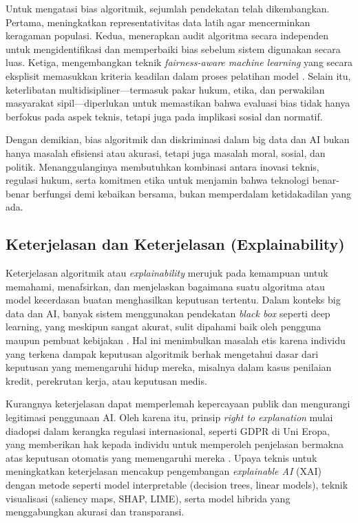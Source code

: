 Untuk mengatasi bias algoritmik, sejumlah pendekatan telah dikembangkan. Pertama, meningkatkan representativitas data latih agar mencerminkan keragaman populasi. Kedua, menerapkan audit algoritma secara independen untuk mengidentifikasi dan memperbaiki bias sebelum sistem digunakan secara luas. Ketiga, mengembangkan teknik \textit{fairness-aware machine learning} yang secara eksplisit memasukkan kriteria keadilan dalam proses pelatihan model \cite{mehrabi2021survey}. Selain itu, keterlibatan multidisipliner—termasuk pakar hukum, etika, dan perwakilan masyarakat sipil—diperlukan untuk memastikan bahwa evaluasi bias tidak hanya berfokus pada aspek teknis, tetapi juga pada implikasi sosial dan normatif.  

Dengan demikian, bias algoritmik dan diskriminasi dalam big data dan AI bukan hanya masalah efisiensi atau akurasi, tetapi juga masalah moral, sosial, dan politik. Menanggulanginya membutuhkan kombinasi antara inovasi teknis, regulasi hukum, serta komitmen etika untuk menjamin bahwa teknologi benar-benar berfungsi demi kebaikan bersama, bukan memperdalam ketidakadilan yang ada.

\subsection{Keterjelasan dan Keterjelasan (Explainability)}

Keterjelasan algoritmik atau \textit{explainability} merujuk pada kemampuan untuk memahami, menafsirkan, dan menjelaskan bagaimana suatu algoritma atau model kecerdasan buatan menghasilkan keputusan tertentu. Dalam konteks big data dan AI, banyak sistem menggunakan pendekatan \textit{black box} seperti deep learning, yang meskipun sangat akurat, sulit dipahami baik oleh pengguna maupun pembuat kebijakan \cite{burrell2016machine}. Hal ini menimbulkan masalah etis karena individu yang terkena dampak keputusan algoritmik berhak mengetahui dasar dari keputusan yang memengaruhi hidup mereka, misalnya dalam kasus penilaian kredit, perekrutan kerja, atau keputusan medis.  

Kurangnya keterjelasan dapat memperlemah kepercayaan publik dan mengurangi legitimasi penggunaan AI. Oleh karena itu, prinsip \textit{right to explanation} mulai diadopsi dalam kerangka regulasi internasional, seperti GDPR di Uni Eropa, yang memberikan hak kepada individu untuk memperoleh penjelasan bermakna atas keputusan otomatis yang memengaruhi mereka \cite{goodman2017european}. Upaya teknis untuk meningkatkan keterjelasan mencakup pengembangan \textit{explainable AI} (XAI) dengan metode seperti model interpretable (decision trees, linear models), teknik visualisasi (saliency maps, SHAP, LIME), serta model hibrida yang menggabungkan akurasi dan transparansi.  

